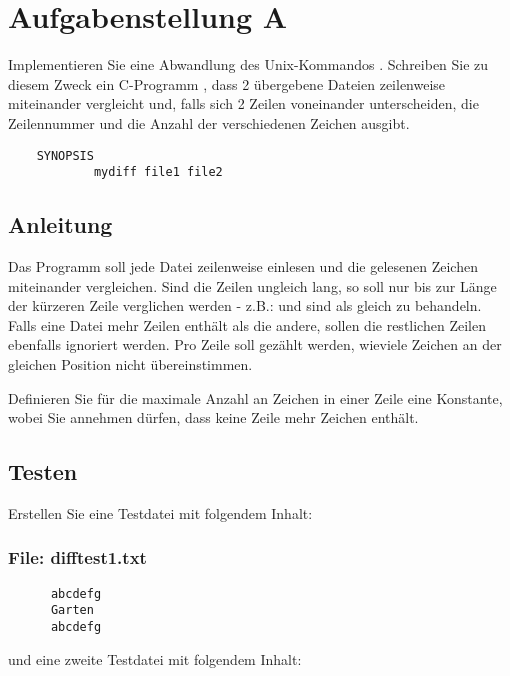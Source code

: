 




\section*{Aufgabenstellung A}
Implementieren Sie eine Abwandlung des Unix-Kommandos .
Schreiben Sie zu diesem Zweck ein C-Programm
, dass 2 übergebene Dateien zeilenweise
miteinander vergleicht und, falls sich 2 Zeilen voneinander
unterscheiden, die Zeilennummer und die Anzahl der
verschiedenen Zeichen ausgibt.

\begin{verbatim}
	SYNOPSIS
      		mydiff file1 file2
\end{verbatim}


\subsection*{Anleitung}
      Das Programm soll jede Datei zeilenweise einlesen und die
      gelesenen Zeichen miteinander vergleichen. Sind die Zeilen
      ungleich lang, so soll nur bis zur Länge der kürzeren Zeile
      verglichen werden - z.B.:  und 
      sind als gleich zu behandeln. Falls eine Datei mehr Zeilen enthält
      als die andere, sollen die restlichen Zeilen ebenfalls ignoriert
      werden. Pro Zeile soll gezählt werden, wieviele Zeichen an der
      gleichen Position nicht übereinstimmen.


      Definieren Sie für die maximale Anzahl an Zeichen in einer
      Zeile eine Konstante, wobei Sie annehmen dürfen, dass keine
      Zeile mehr Zeichen enthält.

\subsection*{Testen}
Erstellen Sie eine Testdatei  mit folgendem Inhalt:
\subsubsection*{File: difftest1.txt}
\begin{verbatim}
      abcdefg
      Garten
      abcdefg
\end{verbatim}
      und eine zweite Testdatei  mit
      folgendem Inhalt:
